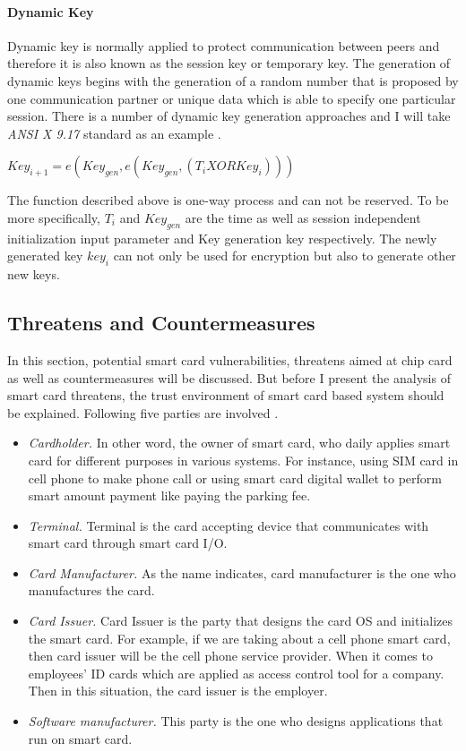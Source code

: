\paragraph{Dynamic Key}
Dynamic key is normally applied to protect communication between peers and therefore it is also known as the session key or temporary key. The generation of dynamic keys begins with the generation of a random number that is proposed by one communication partner or unique data which is able to specify one particular session. There is a number of dynamic key generation approaches and I will take \emph{ANSI X 9.17} standard as an example \cite{handbook}. 
\begin{center}
$Key_{i+1} = e(Key_{gen},e(Key_{gen},(T_{i} XOR Key_{i})))$
\end{center}
The function described above is one-way process and can not be reserved. To be more specifically, $T_{i}$ and  $Key_{gen}$ are the time as well as session independent initialization input parameter and Key generation key respectively. The newly generated  key $key_{i}$ can not only be used for encryption but also to generate other new keys.
\subsection{Threatens and Countermeasures}
In this section, potential smart card vulnerabilities, threatens aimed at chip card as well as countermeasures will be discussed. But before I present the analysis of smart card threatens, the trust environment of smart card based system should be explained. Following five parties are involved \cite{smart_card_attack1}.
\begin{itemize}
\item \emph{Cardholder.} In other word, the owner of smart card, who daily applies smart card for different purposes in various systems. For instance, using SIM card in cell phone to make phone call or using smart card digital wallet to perform smart amount payment like paying the parking fee.
\item \emph{Terminal.} Terminal is the card accepting device that communicates with smart card through smart card I/O.
\item \emph{Card Manufacturer.} As the name indicates, card manufacturer is the one who manufactures  the card.
\item \emph{Card Issuer.} Card Issuer is the party that designs the card OS and initializes the smart card. For example, if we are taking about a cell phone smart card, then card issuer will be the cell phone service provider. When it comes to employees' ID cards which are applied as access control tool for a company. Then in this situation, the card issuer is the employer.
\item \emph{Software manufacturer.} This party is the one who designs applications that run on smart card.
\end{itemize}
